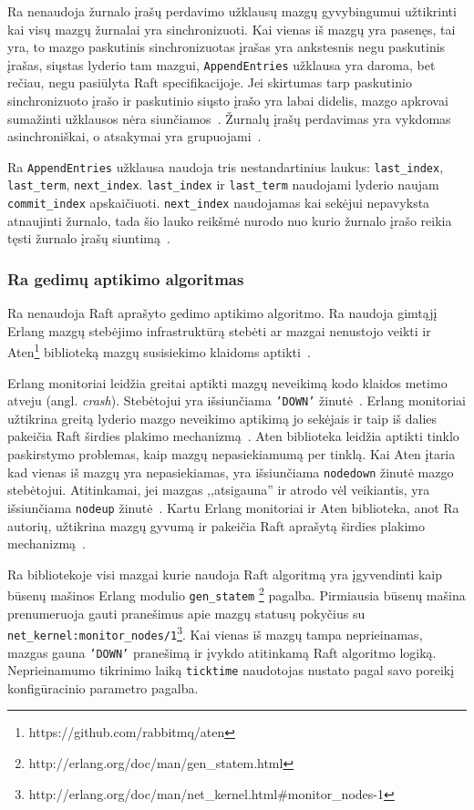 \documentclass{VUMIFPSkursinis}
\begin{document}
Ra nenaudoja žurnalo įrašų perdavimo užklausų mazgų gyvybingumui užtikrinti kai visų mazgų žurnalai yra sinchronizuoti. Kai vienas iš mazgų yra pasenęs, tai yra, to mazgo paskutinis sinchronizuotas įrašas yra ankstesnis negu paskutinis įrašas, siųstas lyderio tam mazgui, \texttt{AppendEntries} užklausa yra daroma, bet rečiau, negu pasiūlyta Raft specifikacijoje. Jei skirtumas tarp paskutinio sinchronizuoto įrašo ir paskutinio siųsto įrašo yra labai didelis, mazgo apkrovai sumažinti užklausos nėra siunčiamos~\cite{rabbitmqra}. Žurnalų įrašų perdavimas yra vykdomas asinchroniškai, o atsakymai yra grupuojami~\cite{rabbitmqra}.

Ra \texttt{AppendEntries} užklausa naudoja tris nestandartinius laukus: \texttt{last\_index}, \texttt{last\_term}, \texttt{next\_index}. \texttt{last\_index} ir \texttt{last\_term} naudojami lyderio naujam \texttt{commit\_index} apskaičiuoti. \texttt{next\_index} naudojamas kai sekėjui nepavyksta atnaujinti žurnalo, tada šio lauko reikšmė nurodo nuo kurio žurnalo įrašo reikia tęsti žurnalo įrašų siuntimą~\cite{rabbitmqra}.

\subsubsection{Ra gedimų aptikimo algoritmas}

Ra nenaudoja Raft aprašyto gedimo aptikimo algoritmo. Ra naudoja gimtąjį Erlang mazgų stebėjimo infrastruktūrą stebėti ar mazgai nenustojo veikti ir Aten\footnote{https://github.com/rabbitmq/aten} biblioteką mazgų susisiekimo klaidoms aptikti~\cite{rabbitmqra}.

Erlang monitoriai leidžia greitai aptikti mazgų neveikimą kodo klaidos metimo atveju (angl. \textit{crash}). Stebėtojui yra išsiunčiama \texttt{'DOWN'} žinutė~\cite{ericsson_erlang_processes_2016}. Erlang monitoriai užtikrina greitą lyderio mazgo neveikimo aptikimą jo sekėjais ir taip iš dalies pakeičia Raft širdies plakimo mechanizmą~\cite{rabbitmqra}. Aten biblioteka leidžia aptikti tinklo paskirstymo problemas, kaip mazgų nepasiekiamumą per tinklą. Kai Aten įtaria kad vienas iš mazgų yra nepasiekiamas, yra išsiunčiama \texttt{nodedown} žinutė mazgo stebėtojui. Atitinkamai, jei mazgas ,,atsigauna'' ir atrodo vėl veikiantis, yra išsiunčiama \texttt{nodeup} žinutė~\cite{rabbitmq_aten_2020}. Kartu Erlang monitoriai ir Aten biblioteka, anot Ra autorių, užtikrina mazgų gyvumą ir pakeičia Raft aprašytą širdies plakimo mechanizmą~\cite{rabbitmqra}. 

Ra bibliotekoje visi mazgai kurie naudoja Raft algoritmą yra įgyvendinti kaip būsenų mašinos Erlang modulio \texttt{gen\_statem} \footnote{http://erlang.org/doc/man/gen\_statem.html} pagalba. 
Pirmiausia būsenų mašina  prenumeruoja gauti pranešimus apie mazgų statusų pokyčius su \texttt{net\_kernel:monitor\_nodes/1}\footnote{http://erlang.org/doc/man/net\_kernel.html\#monitor\_nodes-1}. Kai vienas iš mazgų tampa neprieinamas, mazgas gauna \texttt{'DOWN'} pranešimą ir įvykdo atitinkamą Raft algoritmo logiką. Neprieinamumo tikrinimo laiką \texttt{ticktime} naudotojas nustato pagal savo poreikį konfigūracinio parametro pagalba.
\end{document}
